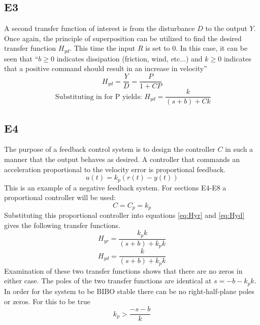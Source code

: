 \documentclass[10pt,titlepage]{article}
\begin{document}
	\subsection*{E3}
		A second transfer function of interest is from the disturbance $D$ to the output $Y$. Once again, the principle of superposition can be utilized to find the desired transfer function $H_{yd}$. This time the input $R$ is set to 0. In this case, it can be seen that ``$b\geq 0$ indicates dissipation (friction, wind, etc...) and $k\geq 0$ indicates that a positive command should result in an increase in velocity''
		\begin{equation}
			H_{yd}=\frac{Y}{D}=\frac{P}{1+CP}
		\end{equation}
		\begin{equation} \label{eq:Hyd}
			\mbox{ Substituting in for P yields: } H_{yd}=\frac{k}{(s+b)+Ck}
		\end{equation}

	\subsection*{E4}
		The purpose of a feedback control system is to design the controller $C$ in such a manner that the output behaves as desired. A controller that commands an acceleration proportional to the velocity error is proportional feedback. $$u(t)=k_p(r(t)-y(t))$$ This is an example of a negative feedback system. For sections E4-E8 a proportional controller will be used: $$C=C_p=k_p$$ Substituting this proportional controller into equations \ref{eq:Hyr} and \ref{eq:Hyd} gives the following transfer functions.
		\begin{equation} \label{eq:propHyr}
			 H_{yr}=\frac{k_pk}{(s+b)+k_pk}
		\end{equation}
		\begin{equation} \label{eq:propHyd}
			H_{yd}=\frac{k}{(s+b)+k_pk}
		\end{equation}
		Examination of these two transfer functions shows that there are no zeros in either case. The poles of the two transfer functions are identical at $s=-b-k_pk$. In order for the system to be BIBO stable there can be no right-half-plane poles or zeros. For this to be true $$k_p>\frac{-s-b}{k}$$
\end{document}
